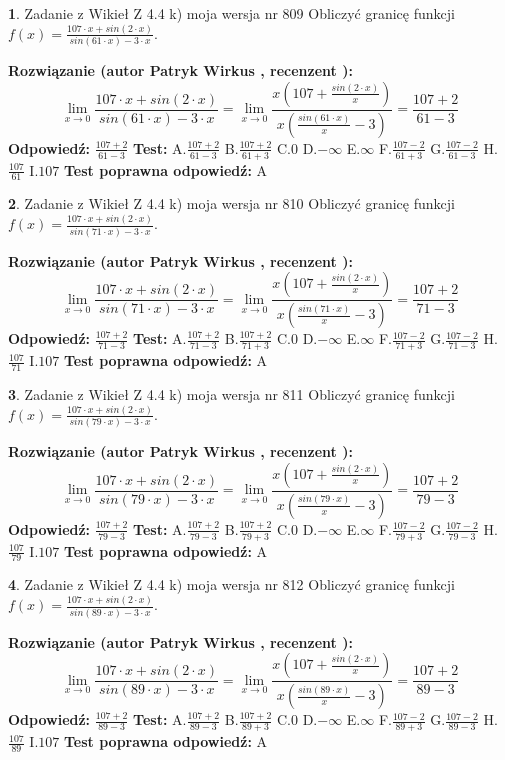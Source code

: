 \documentclass[12pt, a4paper]{article}
\theoremstyle{definition} %
\newtheorem{zad}{}
\newcommand{\zadStart}[1]{\begin{zad}#1\newline}
\newcommand{\zadStop}{\end{zad}}
\newcommand{\rozwStart}[2]{\noindent \textbf{Rozwiązanie (autor #1 , recenzent #2): }\newline}
\newcommand{\rozwStop}{\newline}
\newcommand{\odpStart}{\noindent \textbf{Odpowiedź:}\newline}
\newcommand{\odpStop}{\newline}
\newcommand{\testStart}{\noindent \textbf{Test:}\newline}
\newcommand{\testStop}{\newline}
\newcommand{\kluczStart}{\noindent \textbf{Test poprawna odpowiedź:}\newline}
\newcommand{\kluczStop}{\newline}
\begin{document}
\zadStart{Zadanie z Wikieł Z 4.4 k) moja wersja nr 809}
Obliczyć granicę funkcji $f(x)=\frac{107\cdot x +sin(2\cdot x)}{sin(61\cdot x) -3\cdot x}$.
\zadStop
\rozwStart{Patryk Wirkus}{}
$$\lim\limits_{x\to 0}\frac{107\cdot x +sin(2\cdot x)}{sin(61\cdot x) -3\cdot x}
=\lim\limits_{x\to 0}\frac{x(107+\frac{sin(2\cdot x)}{x})}{x(\frac{sin(61\cdot x)}{x}-3)}
=\frac{107+2}{61-3}$$
\rozwStop
\odpStart
$\frac{107+2}{61-3}$
\odpStop
\testStart
A.$\frac{107+2}{61-3}$
B.$\frac{107+2}{61+3}$
C.$0$
D.$-\infty$
E.$\infty$
F.$\frac{107-2}{61+3}$
G.$\frac{107-2}{61-3}$
H.$\frac{107}{61}$
I.$107$
\testStop
\kluczStart
A
\kluczStop



\zadStart{Zadanie z Wikieł Z 4.4 k) moja wersja nr 810}
Obliczyć granicę funkcji $f(x)=\frac{107\cdot x +sin(2\cdot x)}{sin(71\cdot x) -3\cdot x}$.
\zadStop
\rozwStart{Patryk Wirkus}{}
$$\lim\limits_{x\to 0}\frac{107\cdot x +sin(2\cdot x)}{sin(71\cdot x) -3\cdot x}
=\lim\limits_{x\to 0}\frac{x(107+\frac{sin(2\cdot x)}{x})}{x(\frac{sin(71\cdot x)}{x}-3)}
=\frac{107+2}{71-3}$$
\rozwStop
\odpStart
$\frac{107+2}{71-3}$
\odpStop
\testStart
A.$\frac{107+2}{71-3}$
B.$\frac{107+2}{71+3}$
C.$0$
D.$-\infty$
E.$\infty$
F.$\frac{107-2}{71+3}$
G.$\frac{107-2}{71-3}$
H.$\frac{107}{71}$
I.$107$
\testStop
\kluczStart
A
\kluczStop



\zadStart{Zadanie z Wikieł Z 4.4 k) moja wersja nr 811}
Obliczyć granicę funkcji $f(x)=\frac{107\cdot x +sin(2\cdot x)}{sin(79\cdot x) -3\cdot x}$.
\zadStop
\rozwStart{Patryk Wirkus}{}
$$\lim\limits_{x\to 0}\frac{107\cdot x +sin(2\cdot x)}{sin(79\cdot x) -3\cdot x}
=\lim\limits_{x\to 0}\frac{x(107+\frac{sin(2\cdot x)}{x})}{x(\frac{sin(79\cdot x)}{x}-3)}
=\frac{107+2}{79-3}$$
\rozwStop
\odpStart
$\frac{107+2}{79-3}$
\odpStop
\testStart
A.$\frac{107+2}{79-3}$
B.$\frac{107+2}{79+3}$
C.$0$
D.$-\infty$
E.$\infty$
F.$\frac{107-2}{79+3}$
G.$\frac{107-2}{79-3}$
H.$\frac{107}{79}$
I.$107$
\testStop
\kluczStart
A
\kluczStop



\zadStart{Zadanie z Wikieł Z 4.4 k) moja wersja nr 812}
Obliczyć granicę funkcji $f(x)=\frac{107\cdot x +sin(2\cdot x)}{sin(89\cdot x) -3\cdot x}$.
\zadStop
\rozwStart{Patryk Wirkus}{}
$$\lim\limits_{x\to 0}\frac{107\cdot x +sin(2\cdot x)}{sin(89\cdot x) -3\cdot x}
=\lim\limits_{x\to 0}\frac{x(107+\frac{sin(2\cdot x)}{x})}{x(\frac{sin(89\cdot x)}{x}-3)}
=\frac{107+2}{89-3}$$
\rozwStop
\odpStart
$\frac{107+2}{89-3}$
\odpStop
\testStart
A.$\frac{107+2}{89-3}$
B.$\frac{107+2}{89+3}$
C.$0$
D.$-\infty$
E.$\infty$
F.$\frac{107-2}{89+3}$
G.$\frac{107-2}{89-3}$
H.$\frac{107}{89}$
I.$107$
\testStop
\kluczStart
A
\kluczStop
\end{document}
